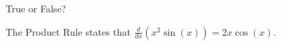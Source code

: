 \documentclass{ximera}
\author{Gregory Hartman \and Matthew Carr}
\begin{document}
\begin{exercise}




True or False?
\begin{center}
The Product Rule states that $\frac{d}{dx}\left(x^2\sin(x)\right)=2x\cos(x)$.
\end{center}

\begin{prompt}
\begin{multipleChoice}
\end{multipleChoice}
\end{prompt}
\end{exercise}
\end{document}
